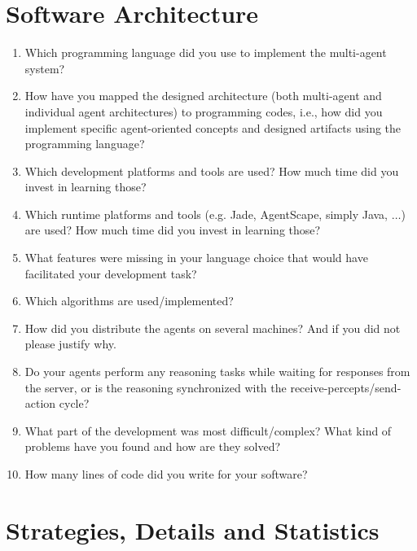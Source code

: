 \documentclass{llncs}
\begin{document}
\section{Software Architecture}

\begin{enumerate}
\item Which programming language did you use to implement the
  multi-agent system?
\item How have you mapped the designed architecture (both multi-agent
  and individual agent architectures) to programming codes, i.e., how
  did you implement specific agent-oriented concepts and designed
  artifacts using the programming language?
\item Which development platforms and tools are used? How much time did you invest in learning those?
\item Which runtime platforms and tools (e.g. Jade, AgentScape, simply Java, $\ldots$) are used? How much time did you invest in learning those?
 \item What features were missing in your language choice that would have facilitated your development task?
\item Which algorithms are used/implemented?
\item How did you distribute the agents on several machines? And if you did not
please justify why.
\item Do your agents perform any reasoning tasks while waiting for responses from the server, or is the reasoning synchronized with the receive-percepts/send-action cycle?
\item What part of the development was most difficult/complex? What
  kind of problems have you found and how are they solved?
\item How many lines of code did you write for your software?
\end{enumerate}

\section{Strategies, Details and Statistics}\label{sec:strategies}
\end{document}
